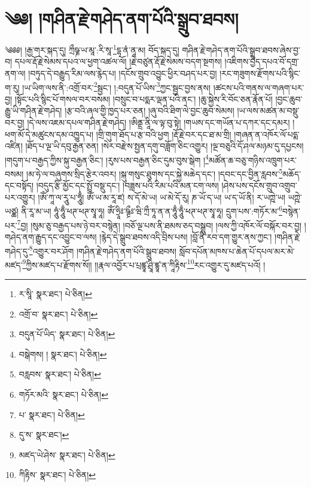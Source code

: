\setcounter{footnote}{0} 
\chapter{༄༅། །གཤིན་རྗེ་གཤེད་ནག་པོའི་སྒྲུབ་ཐབས།}༄༅༅། །རྒྱ་གར་སྐད་དུ། ཀྲྀཥྞ་ཡ་མཱ་:རི་སཱ་\footnote{ར་སཱི་  སྣར་ཐང་།  པེ་ཅིན། }དྷ་ནཾ་ནཱ་མ། བོད་སྐད་དུ། གཤིན་རྗེ་གཤེད་ནག་པོའི་སྒྲུབ་ཐབས་ཞེས་བྱ་བ། དཔལ་རྡོ་རྗེ་སེམས་དཔའ་ལ་ཕྱག་འཚལ་ལོ། །རྗེ་བཙུན་རྡོ་རྗེ་སེམས་བདག་སྔགས། །འཇིགས་བྱེད་དཔའ་བོ་དགྲ་ནག་ལ། །བཏུད་དེ་བརྒྱུད་རིམ་ལས་རྙེད་པ། །དངོས་གྲུབ་འབྱུང་ཕྱིར་བཤད་པར་བྱ། །རང་གཟུགས་རྫོགས་པའི་སྙིང་ག་རུ། །ཡ་ཡིག་ལས་ནི་:འགྲོ་བར་\footnote{འགྲོ་བ་  སྣར་ཐང་།  པེ་ཅིན། }སྦྱང་། །:བདུན་པོ་ཡིས་\footnote{བདུན་པོ་ཡིད་  སྣར་ཐང་།  པེ་ཅིན། }ཀྱང་སྦྱང་བྱས་ནས། །ཚངས་པའི་གནས་ལ་གཞག་པར་བྱ། །སྟོང་པའི་སྙིང་པོ་གསལ་བར་བསམ། །བསྲུང་བ་པདྨར་ལྡན་པའི་ནང་། །ཆུ་སྐྱེས་རི་བོང་ཅན་རྣོན་པོ། །བྱང་ཆུབ་རྒྱུ་ཡི་གཤིན་རྗེ་གཤེད། །རྩ་བའི་ཞལ་གྱི་ཁྱད་པར་ཅན། །ཞུ་བའི་ཐིག་ལེ་བྱང་ཆུབ་སེམས། །ཡ་ལས་མཚན་མ་བསྡུ་བར་བྱ། །དེ་ལས་འཇམ་དཔལ་གཤིན་རྗེ་གཤེད། །ཨིནྡྲ་ནཱི་ལ་ལྟ་བུ་སྟེ། །གཡས་དང་གཡོན་པ་དཀར་དང་དམར། །ཕག་མོ་དེ་མཚུངས་དམ་འཁྱུད་པ། །གྲི་གུག་ཐོད་པ་རྩ་བའི་ཕྱག །རྡོ་རྗེ་བར་དང་ཐ་མ་གྲི། །གཞན་ན་འཁོར་ལོ་པདྨ་འཛིན། །ཐོད་པ་ལྔ་ཡི་དབུ་རྒྱན་ཅན། །སེར་བརྫེས་སྤྱན་དགུ་བཟློག་ཅིང་འགྱུར། །ལྔ་བཅུའི་དོ་ཤལ་མཉམ་དུ་དཔྱངས། །གདུག་པ་བརྒྱད་ཀྱིས་སྐུ་བརྒྱན་ཅིང་། །རུས་པས་བརྒྱན་ཅིང་དུམ་བུས་སྒེག །\footnote{བསྒེགས། །  སྣར་ཐང་།  པེ་ཅིན། }མཚོན་ཆ་བཅུ་གཉིས་འཁྲུག་པར་བསམ། །མ་ཧེ་ལ་བཞུགས་སྲིད་རྩེར་འབར། །སྐུ་གསུང་ཐུགས་དང་སྐྱེ་མཆེད་དང་། །དབང་དང་བྱིན་རླབས་\footnote{བརླབས་  སྣར་ཐང་།  པེ་ཅིན། }མཆོད་དང་བསྟོད། །བདུད་རྩི་མྱོང་དང་སྤྲོ་བསྡུ་དང་། །བཟླས་པའི་རིམ་པའི་མན་ངག་ལས། །ཤེས་པས་དངོས་གྲུབ་འགྲུབ་པར་འགྱུར། །ཨོཾ་ཀཱ་ལ་རཱུ་པ་ཧཱུྃ། ཨོཾ་ཡ་མ་རཱ་ཛ། ས་དོ་མེ་ཡ། ཡ་མེ་དོ་རུ། ཎ་ཡོ་ད་ཡ། ཡ་ད་ཡོ་ནི། ར་ཡཀྵེ་ཡ། ཡཀྵེ་ཡཙྪ། ནི་རཱ་མ་ཡ། ཧཱུཾ་ཧཱུྃ་ཕཊ་ཕཊ་སྭཱ་ཧཱ། ཨོཾ་ཧྲཱིཿ་ཥྚྲྀཿ་ཝི་ཀྲྀ་ཏཱ་ན་ན་ཧཱུྃ་ཧཱུྃ་ཕཊ་ཕཊ་སྭཱ་ཧཱ། དྲུག་པས་:གཏོར་མ་\footnote{གཏོར་མའི་  སྣར་ཐང་།  པེ་ཅིན། }བསྙེན་པར་\footnote{པ་  སྣར་ཐང་།  པེ་ཅིན། }བྱ། །སུམ་ཅུ་བརྒྱད་པས་ཉེ་བར་བསྙེན། །བཅོ་ལྔ་པས་ནི་ཐམས་ཅད་བསྒྲུབ། །ལས་ཀྱི་འཁོར་ལོ་བསྐོར་བར་བྱ། །གཤེད་ནག་རྒྱུད་དང་འབྱུང་བ་ལས། །རྙེད་དེ་སྒྲུབ་ཐབས་འདི་བྲིས་པས། །བློ་ནི་རབ་དག་གྱུར་ནས་ཀྱང་། །གཤིན་རྗེ་གཤེད་དུ་\footnote{དུ་ས་  སྣར་ཐང་། }འགྱུར་བར་ཤོག །གཤིན་རྗེ་གཤེད་ནག་པོའི་སྒྲུབ་ཐབས། སློབ་དཔོན་མཁས་པ་ཆེན་པོ་དཔལ་མར་མེ་མཛད་\footnote{མཛད་ཡེ་ཤེས་  སྣར་ཐང་།  པེ་ཅིན། }ཀྱིས་མཛད་པ་རྫོགས་སོ།། །།རྣལ་འབྱོར་པ་པྲཛྙཱ་ཤྲཱི་ཛྙཱ་ན་ཀཱིརྟིས་\footnote{ཀིརྟིས་  སྣར་ཐང་།  པེ་ཅིན། }རང་འགྱུར་དུ་མཛད་པའོ། ། 